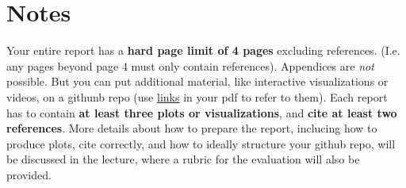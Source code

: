 \documentclass{article}
\theoremstyle{plain}
\theoremstyle{definition}
\theoremstyle{remark}
\begin{document}
\section*{Notes} 

Your entire report has a \textbf{hard page limit of 4 pages} excluding references. (I.e. any pages beyond page 4 must only contain references). Appendices are \emph{not} possible. But you can put additional material, like interactive visualizations or videos, on a githunb repo (use \href{https://github.com/pnkraemer/tueplots}{links} in your pdf to refer to them). Each report has to contain \textbf{at least three plots or visualizations}, and \textbf{cite at least two references}. More details about how to prepare the report, inclucing how to produce plots, cite correctly, and how to ideally structure your github repo, will be discussed in the lecture, where a rubric for the evaluation will also be provided.




\end{document}
